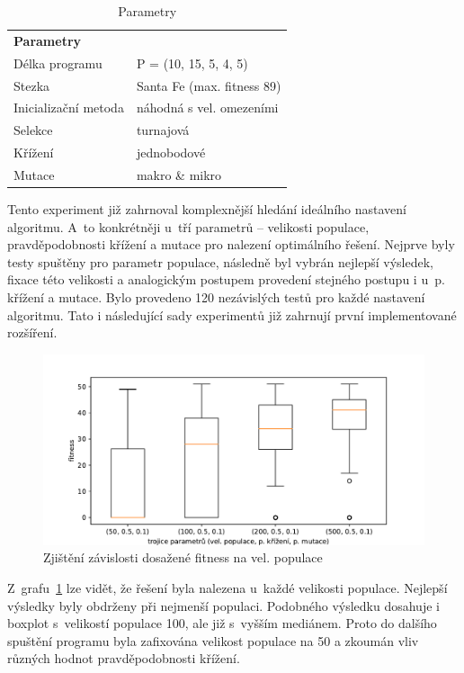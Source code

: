 \begin{table}[!h]
\centering
\begin{tabular}{ll}
\hline
\textbf{Parametry}      &             \\
Délka programu       & P = (10, 15, 5, 4, 5)  \\
Stezka               & Santa Fe (max. fitness 89)\\
Inicializační metoda & náhodná s vel. omezeními  \\
Selekce              & turnajová           \\
Křížení              & jednobodové \\
Mutace               & makro \& mikro \\ \hline
\end{tabular}
\caption{Parametry}
\end{table}  

Tento experiment již zahrnoval komplexnější hledání ideálního nastavení algoritmu. A~to konkrétněji u~tří parametrů -- velikosti populace, pravděpodobnosti křížení a mutace pro nalezení optimálního řešení. Nejprve byly testy spuštěny pro parametr populace, následně byl vybrán nejlepší výsledek, fixace této velikosti a analogickým postupem provedení stejného postupu i u~p. křížení a mutace. Bylo provedeno 120 nezávislých testů pro každé nastavení algoritmu. Tato i následující sady experimentů již zahrnují první implementované rozšíření. 

\begin{figure}[!h]
    \centering
    \includegraphics[scale=0.75]{obrazky-figures/exp-lgp-santafe-searching-params-1.pdf}
    \caption{Zjištění závislosti dosažené fitness na vel. populace}
    \label{fig:exp-lgp-santafe-searching-params-1}
\end{figure}

Z~grafu~\ref{fig:exp-lgp-santafe-searching-params-1} lze vidět, že řešení byla nalezena u~každé velikosti populace. Nejlepší výsledky byly obdrženy při nejmenší populaci. Podobného výsledku dosahuje i boxplot s~velikostí populace 100, ale již s~vyšším mediánem. Proto do dalšího spuštění programu byla zafixována velikost populace na 50 a zkoumán vliv různých hodnot pravděpodobnosti křížení. 

